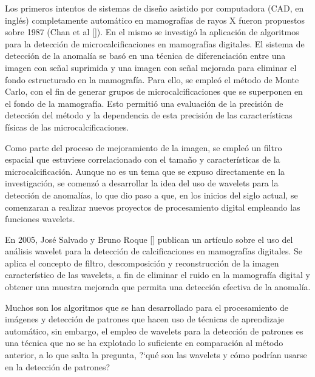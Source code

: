 \par Los primeros intentos de sistemas de dise\~no asistido por computadora (CAD, en ingl\'es) completamente automático en mamografías de rayos X fueron propuestos sobre 1987 (Chan et al [\textcolor{cyan}{\cite{4}}]). En el mismo se investig\'o la aplicaci\'on de algoritmos para la detecci\'on de microcalcificaciones en mamograf\'ias digitales. El sistema de detecci\'on de la anomal\'ia se bas\'o en una t\'ecnica de diferenciaci\'on entre una imagen con se\~nal suprimida y una imagen con se\~nal mejorada para eliminar el fondo estructurado en la mamografía. Para ello, se emple\'o el m\'etodo de Monte Carlo, con el fin de generar grupos de microcalcificaciones que se superponen en el fondo de la mamograf\'ia. Esto permiti\'o una evaluación de la precisión de detección del método y la dependencia de esta precisión de las características físicas de las microcalcificaciones.

\par Como parte del proceso de mejoramiento de la imagen, se emple\'o un filtro espacial que estuviese correlacionado con el tama\~no y caracter\'isticas de la microcalcificaci\'on. Aunque no es un tema que se expuso directamente en la investigaci\'on, se comenz\'o a desarrollar la idea del uso de wavelets para la detecci\'on de anomal\'ias, lo que dio paso a que, en los inicios del siglo actual, se comenzaran a realizar nuevos proyectos de procesamiento digital empleando las funciones wavelets.

\par En 2005, Jos\'e Salvado y Bruno Roque [\textcolor{cyan}{\cite{5}}] publican un art\'iculo sobre el uso del an\'alisis wavelet para la detecci\'on de calcificaciones en mamograf\'ias digitales. Se aplica el concepto de filtro, descomposici\'on y reconstrucci\'on de la imagen caracter\'istico de las wavelets, a fin de eliminar el ruido en la mamograf\'ia digital y obtener una muestra mejorada que permita una detecci\'on efectiva de la anomal\'ia.

\par Muchos son los algoritmos que se han desarrollado para el procesamiento de im\'agenes y detecci\'on de patrones que hacen uso de t\'ecnicas de aprendizaje autom\'atico, sin embargo, el empleo de wavelets para la detecci\'on de patrones es una t\'ecnica que no se ha explotado lo suficiente en comparaci\'on al m\'etodo anterior, a lo que salta la pregunta, ?`qu\'e son las wavelets y c\'omo podr\'ian usarse en la detecci\'on de patrones?

